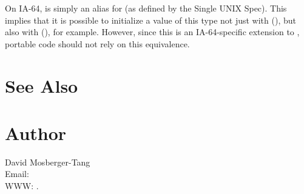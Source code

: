 \documentclass{article}
\begin{document}
On IA-64,  is simply an alias for
 (as defined by the Single UNIX Spec).  This implies
that it is possible to initialize a value of this type not just with
(), but also with (), for
example.  However, since this is an IA-64-specific extension to
, portable code should not rely on this equivalence.


\section{See Also}


\section{Author}

\noindent
David Mosberger-Tang\\
Email: \\
WWW: .
\LatexManEnd
\end{document}
